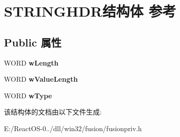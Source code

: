 \hypertarget{struct_s_t_r_i_n_g_h_d_r}{}\section{S\+T\+R\+I\+N\+G\+H\+D\+R结构体 参考}
\label{struct_s_t_r_i_n_g_h_d_r}
\subsection*{Public 属性}
\begin{DoxyCompactItemize}
\item 
\mbox{\label{struct_s_t_r_i_n_g_h_d_r_a6f1161a846ce0e3f1f7eeca297f3d47f}} 
W\+O\+RD {\bfseries w\+Length}
\item 
\mbox{\label{struct_s_t_r_i_n_g_h_d_r_a58d3fe9a2428b47340bc1a69cb07fa5f}} 
W\+O\+RD {\bfseries w\+Value\+Length}
\item 
\mbox{\label{struct_s_t_r_i_n_g_h_d_r_ae32a532116fdae867e77563f205378fc}} 
W\+O\+RD {\bfseries w\+Type}
\end{DoxyCompactItemize}


该结构体的文档由以下文件生成\+:\begin{DoxyCompactItemize}
\item 
E\+:/\+React\+O\+S-\/0../dll/win32/fusion/fusionpriv.\+h\end{DoxyCompactItemize}
